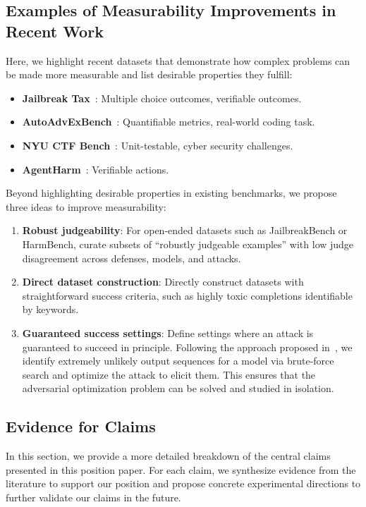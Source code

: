 \subsection{Examples of Measurability Improvements in Recent Work}\label{app:measurability}
Here, we highlight recent datasets that demonstrate how complex problems can be made more measurable and list desirable properties they fulfill:
\begin{itemize}
    \item \textbf{Jailbreak Tax}~\cite{nikolic2025jailbreak}: Multiple choice outcomes, verifiable outcomes.
    \item \textbf{AutoAdvExBench}~\cite{carlini2025autoadvexbench}: Quantifiable metrics, real-world coding task.
    \item \textbf{NYU CTF Bench}~\cite{shao2025nyu}: Unit-testable, cyber security challenges.
    \item \textbf{AgentHarm}~\cite{andriushchenko2024agentharm}: Verifiable actions.
\end{itemize}

Beyond highlighting desirable properties in existing benchmarks, we propose three ideas to improve measurability:
\begin{enumerate}
    \item \textbf{Robust judgeability}: For open-ended datasets such as JailbreakBench or HarmBench, curate subsets of ``robustly judgeable examples'' with low judge disagreement across defenses, models, and attacks.
    \item \textbf{Direct dataset construction}: Directly construct datasets with straightforward success criteria, such as highly toxic completions identifiable by keywords.
    \item \textbf{Guaranteed success settings}: Define settings where an attack is guaranteed to succeed in principle. Following the approach proposed in~\cite{carlini2023aligned}, we identify extremely unlikely output sequences for a model via brute-force search and optimize the attack to elicit them. This ensures that the adversarial optimization problem can be solved and studied in isolation.
\end{enumerate}

\subsection{Evidence for Claims}\label{app:evidence}
In this section, we provide a more detailed breakdown of the central claims presented in this position paper. For each claim, we synthesize evidence from the literature to support our position and propose concrete experimental directions to further validate our claims in the future.

